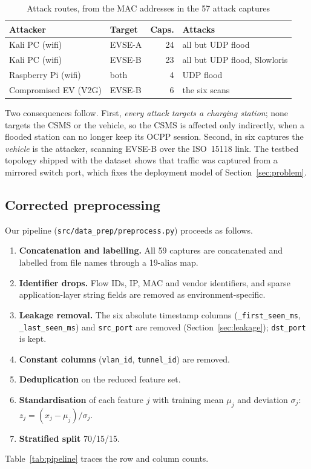 \documentclass[conference]{IEEEtran}
\newcommand{\col}[1]{\texttt{\small #1}}
\begin{document}
\begin{table}[!t]
\caption{Attack routes, from the MAC addresses in the 57 attack captures}
\label{tab:routes}
\centering
\footnotesize
\begin{tabularx}{\columnwidth}{@{}llrL@{}}
\toprule
\textbf{Attacker} & \textbf{Target} & \textbf{Caps.} & \textbf{Attacks} \\
\midrule
Kali PC (wifi)        & EVSE-A & 24 & all but UDP flood \\
Kali PC (wifi)        & EVSE-B & 23 & all but UDP flood, Slowloris \\
Raspberry Pi (wifi)   & both   & 4  & UDP flood \\
Compromised EV (V2G)  & EVSE-B & 6  & the six scans \\
\bottomrule
\end{tabularx}
\end{table}

Two consequences follow. First, \emph{every attack targets a charging station}; none targets the CSMS or the vehicle, so the CSMS is affected only indirectly, when a flooded station can no longer keep its OCPP session. Second, in six captures the \emph{vehicle} is the attacker, scanning EVSE-B over the ISO~15118 link. The testbed topology shipped with the dataset shows that traffic was captured from a mirrored switch port, which fixes the deployment model of Section~\ref{sec:problem}.

\subsection{Corrected preprocessing}

Our pipeline (\col{src/data\_prep/preprocess.py}) proceeds as follows.
\begin{enumerate}
    \item \textbf{Concatenation and labelling.} All 59 captures are concatenated and labelled from file names through a 19-alias map.
    \item \textbf{Identifier drops.} Flow IDs, IP, MAC and vendor identifiers, and sparse application-layer string fields are removed as environment-specific.
    \item \textbf{Leakage removal.} The six absolute timestamp columns (\col{*\_first\_seen\_ms}, \col{*\_last\_seen\_ms}) and \col{src\_port} are removed (Section~\ref{sec:leakage}); \col{dst\_port} is kept.
    \item \textbf{Constant columns} (\col{vlan\_id}, \col{tunnel\_id}) are removed.
    \item \textbf{Deduplication} on the reduced feature set.
    \item \textbf{Standardisation} of each feature $j$ with training mean $\mu_j$ and deviation $\sigma_j$: $z_j = (x_j - \mu_j)/\sigma_j$.
    \item \textbf{Stratified split} 70/15/15.
\end{enumerate}
Table~\ref{tab:pipeline} traces the row and column counts.
\end{document}
